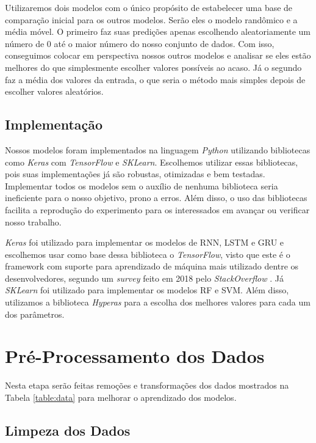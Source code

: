 Utilizaremos dois modelos com o único propósito de estabelecer uma base de comparação inicial para os outros modelos. Serão eles o modelo randômico e a média móvel. O primeiro faz suas predições apenas escolhendo aleatoriamente um número de 0 até o maior número do nosso conjunto de dados. Com isso, conseguimos colocar em perspectiva nossos outros modelos e analisar se eles estão melhores do que simplesmente escolher valores possíveis ao acaso. Já o segundo faz a média dos valores da entrada, o que seria o método mais simples depois de escolher valores aleatórios.

\subsection{Implementação}


Nossos modelos foram implementados na linguagem \textit{Python} utilizando bibliotecas como \textit{Keras} com \textit{TensorFlow} e \textit{SKLearn}. Escolhemos utilizar essas bibliotecas, pois suas implementações já são robustas, otimizadas e bem testadas. Implementar todos os modelos sem o auxílio de nenhuma biblioteca seria ineficiente para o nosso objetivo,  prono a erros. Além disso, o uso das bibliotecas facilita a reprodução do experimento para os interessados em avançar ou verificar nosso trabalho.

\textit{Keras} foi utilizado para implementar os modelos de \acrshort{RNN}, \acrshort{LSTM} e \acrshort{GRU} e escolhemos usar como base dessa biblioteca o \textit{TensorFlow}, visto que este é o framework com suporte para aprendizado de máquina mais utilizado dentre os desenvolvedores, segundo um \textit{survey} feito em 2018 pelo \textit{StackOverflow} \cite{stack_2018}. Já \textit{SKLearn} foi utilizado para implementar os modelos \acrshort{RF} e \acrshort{SVM}. Além disso, utilizamos a biblioteca \textit {Hyperas} para a escolha dos melhores valores para cada um dos parâmetros.

\section{Pré-Processamento dos Dados}

Nesta etapa serão feitas remoções e transformações dos dados mostrados na Tabela \ref{table:data} para melhorar o aprendizado dos modelos.

\subsection{Limpeza dos Dados}

